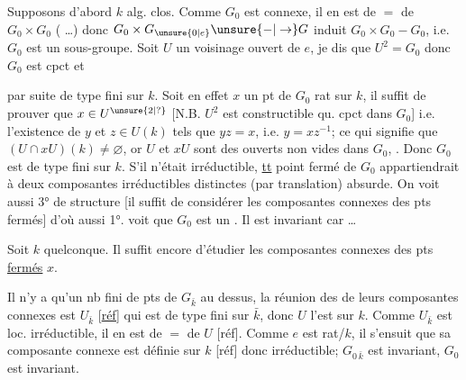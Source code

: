 Supposons d'abord $k$ alg. clos. 
 Comme $G_0$ est connexe,
il en est de $=$ de $G_0\times G_0$ ( \ldots)
donc $G_0\times G_{\unsure{0|e}}\unsure{-|\to}G$ induit $G_0\times G_0-G_0$,
i.e. $G_0$ est un sous-groupe. Soit $U$
un voisinage ouvert  de $e$, je dis que
$U^2=G_0$  donc $G_0$ est  cpct et

par suite de type fini sur $k$. Soit en effet
$x$ un pt de $G_0$ rat sur $k$, il suffit de
prouver que $x\in U^{\unsure{2|?}}$ [N.B. $U^2$ est constructible
qu. cpct dans $G_0$] i.e.  l'existence
de $y$ et $z\in U(k)$ tels que $yz=x$, i.e.
$y=xz^{-1}$; ce qui signifie que $(U\cap xU)(k)\ne\varnothing$,
or $U$ et $xU$ sont des ouverts non vides
dans $G_0$, . Donc $G_0$ est de type
fini sur $k$. S'il n'était irréductible, \uline{tt}
point fermé de $G_0$ appartiendrait à  deux composantes irréductibles
distinctes (par translation) absurde. On voit
aussi  3°   de
structure [il suffit de considérer les
composantes connexes des pts fermés]
d'où aussi 1°.  
voit que $G_0$ est un . Il est invariant
car \ldots

 Soit $k$ quelconque.  Il
suffit encore d'étudier les composantes
connexes  des pts \uline{fermés} $x$. 

Il n'y a qu'un nb fini de pts de
$G_{\bar k}$ au dessus,  la réunion des
de leurs composantes connexes est $U_{\bar k}$ [\uline{réf}]
\margin{$\times$} qui est de type fini sur
$\bar k$, donc $U$ l'est sur $k$. Comme $U_{\bar k}$ est
loc. irréductible, il en est de $=$ de $U$
\margin{$\times$}[réf]. Comme $e$ est rat/$k$, il s'ensuit
que sa composante connexe  est définie sur $k$
[réf] donc  irréductible;  
$G_{0\,\bar k}$ est invariant, $G_0$ est invariant.

